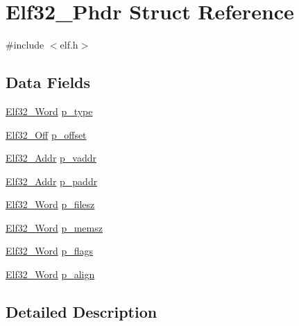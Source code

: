 \hypertarget{struct_elf32___phdr}{\section{Elf32\-\_\-\-Phdr Struct Reference}
\label{struct_elf32___phdr}
}


{\ttfamily \#include $<$elf.\-h$>$}

\subsection*{Data Fields}
\begin{DoxyCompactItemize}
\item 
\hyperlink{elf_8h_af5924ece606c732e86f8263a19408e45}{Elf32\-\_\-\-Word} \hyperlink{struct_elf32___phdr_a1b4ed5de6b34c773a4bd176b0b1a486b}{p\-\_\-type}
\item 
\hyperlink{elf_8h_a655751f9b317369b93c581ea8ed84516}{Elf32\-\_\-\-Off} \hyperlink{struct_elf32___phdr_a8506a191f6eb19d977badcc7b79304da}{p\-\_\-offset}
\item 
\hyperlink{elf_8h_a40c6d4571e6001f443cc6a6474620158}{Elf32\-\_\-\-Addr} \hyperlink{struct_elf32___phdr_acabdf03daaa792ce4051b6883b0df40d}{p\-\_\-vaddr}
\item 
\hyperlink{elf_8h_a40c6d4571e6001f443cc6a6474620158}{Elf32\-\_\-\-Addr} \hyperlink{struct_elf32___phdr_a0d8f4187ea1e170564f61f9de0a2e0b4}{p\-\_\-paddr}
\item 
\hyperlink{elf_8h_af5924ece606c732e86f8263a19408e45}{Elf32\-\_\-\-Word} \hyperlink{struct_elf32___phdr_a3b607fe05ae8ac5dbe7b328eb25b9c11}{p\-\_\-filesz}
\item 
\hyperlink{elf_8h_af5924ece606c732e86f8263a19408e45}{Elf32\-\_\-\-Word} \hyperlink{struct_elf32___phdr_a927f5fb1182d6e414c7ac3573aed393f}{p\-\_\-memsz}
\item 
\hyperlink{elf_8h_af5924ece606c732e86f8263a19408e45}{Elf32\-\_\-\-Word} \hyperlink{struct_elf32___phdr_a39014f5cea369c520082e26e9518a697}{p\-\_\-flags}
\item 
\hyperlink{elf_8h_af5924ece606c732e86f8263a19408e45}{Elf32\-\_\-\-Word} \hyperlink{struct_elf32___phdr_a66609694ebd2c2235315b7a25b2bae63}{p\-\_\-align}
\end{DoxyCompactItemize}


\subsection{Detailed Description}


